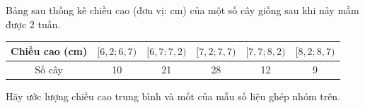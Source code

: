 \begin{ex}%
	Bảng sau thống kê chiều cao (đơn vị: cm) của một số cây giống sau khi nảy mầm  được $2$ tuần.
	\begin{center}
		\begin{tabular}{|*{6}{c|}}
			 \hline
			Chiều cao (cm) & $[6{,}2; 6{,}7)$ &$[6{,}7; 7{,}2)$ &$[7{,}2; 7{,}7)$ &$[7{,}7; 8{,}2)$  &$[8{,}2; 8{,}7)$ \\
			\hline 
			Số cây & 10 & 21  & 28 & 12 & 9 \\
			 \hline
		\end{tabular}
	\end{center}
	Hãy ước lượng  chiều cao trung bình và mốt của mẫu số liệu ghép nhóm trên.
\end{ex}

